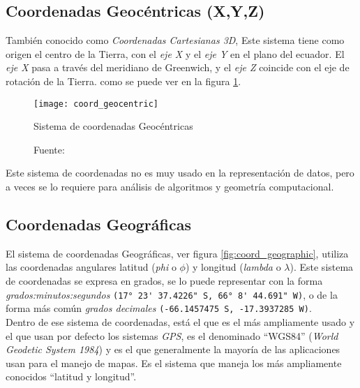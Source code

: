     \subsection{Coordenadas Geocéntricas (X,Y,Z)} %
      \label{sub:coordenadas_geocentricas}
        También conocido como \emph{Coordenadas Cartesianas 3D}, Este sistema tiene como origen el centro de la Tierra, con el \emph{eje X} y el \emph{eje Y} en el plano del ecuador. El \emph{eje X} pasa a través del meridiano de Greenwich, y el \emph{eje Z}  coincide con el eje de rotación de la Tierra. como se puede ver en la figura \ref{fig:coord_geocentric}.

        \begin{figure}[H]
          \begin{center}
            \texttt{[image: coord\_geocentric]}
            \caption{Sistema de coordenadas Geocéntricas}
            \label{fig:coord_geocentric}
            \caption*{Fuente: \cite{coords2009} }
          \end{center}
        \end{figure}

        Este sistema de coordenadas no es muy usado en la representación de datos, pero a veces se lo requiere para análisis de algoritmos y geometría computacional.

      \subsection{Coordenadas Geográficas} %
      \label{sub:coordenadas_geograficas}
        El sistema de coordenadas Geográficas, ver figura \ref{fig:coord_geographic}, utiliza las coordenadas angulares latitud  (\emph{phi} o ${\phi}$) y longitud (\emph{lambda} o ${\lambda}$). Este sistema de coordenadas se expresa en grados, se lo puede representar con la forma \emph{grados:minutos:segundos }\verb|(17° 23' 37.4226" S, 66° 8' 44.691" W)|, o de la forma más común \emph{grados decimales} \verb|(-66.1457475 S, -17.3937285 W)|. \\

  Dentro de ese sistema de coordenadas, está el que es el más ampliamente usado y el que usan por defecto los sistemas \emph{GPS}, es el denominado ``WGS84'' (\emph{World Geodetic System 1984}) y es el que generalmente la mayoría de las aplicaciones usan para el manejo de mapas. Es el sistema que maneja los más ampliamente conocidos ``latitud y longitud''.\\

